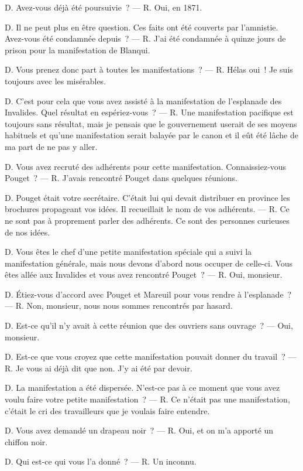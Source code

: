 \documentclass[french,twoside]{book} %
\begin{document}
\noindent D. Avez-vous déjà été poursuivie ? — R. Oui, en 1871.\par
D. Il ne peut plus en être question. Ces faits ont été couverts par l’amnistie. Avez-vous été condamnée depuis ? — R. J’ai  été condamnée à quinze jours de prison pour la manifestation de Blanqui.\par
D. Vous prenez donc part à toutes les manifestations ? — R. Hélas oui ! Je suis toujours avec les misérables.\par
D. C’est pour cela que vous avez assisté à la manifestation de l’esplanade des Invalides. Quel résultat en espériez-vous ? — R. Une manifestation pacifique est toujours sans résultat, mais je pensais que le gouvernement userait de ses moyens habituels et qu’une manifestation serait balayée par le canon et il eût été lâche de ma part de ne pas y aller.\par
D. Vous avez recruté des adhérents pour cette manifestation. Connaissiez-vous Pouget ? — R. J’avais rencontré Pouget dans quelques réunions.\par
D. Pouget était votre secrétaire. C’était lui qui devait distribuer en province les brochures propageant vos idées. Il recueillait le nom de vos adhérents. — R. Ce ne sont pas à proprement parler des adhérents. Ce sont des personnes curieuses de nos idées.\par
D. Vous êtes le chef d’une petite manifestation spéciale qui a suivi la manifestation générale, mais nous devons d’abord nous occuper de celle-ci. Vous êtes allée aux Invalides et vous avez rencontré Pouget ? — R. Oui, monsieur.\par
D. Étiez-vous d’accord avec Pouget et Mareuil pour vous rendre à l’esplanade ? — R. Non, monsieur, nous nous sommes rencontrés par hasard.\par
D. Est-ce qu’il n’y avait à cette réunion que des ouvriers sans ouvrage ? — Oui, monsieur.\par
D. Est-ce que vous croyez que cette manifestation pouvait donner du travail ? — R. Je vous ai déjà dit que non. J’y ai été par devoir.\par
D. La manifestation a été dispersée. N’est-ce pas à ce moment que vous avez voulu faire votre petite manifestation ? — R. Ce n’était pas une manifestation, c’était le cri des travailleurs que je voulais faire entendre.\par
D. Vous avez demandé un drapeau noir ? — R. Oui, et on m’a apporté un chiffon noir.\par
D. Qui est-ce qui vous l’a donné ? — R. Un inconnu.\par
\end{document}
